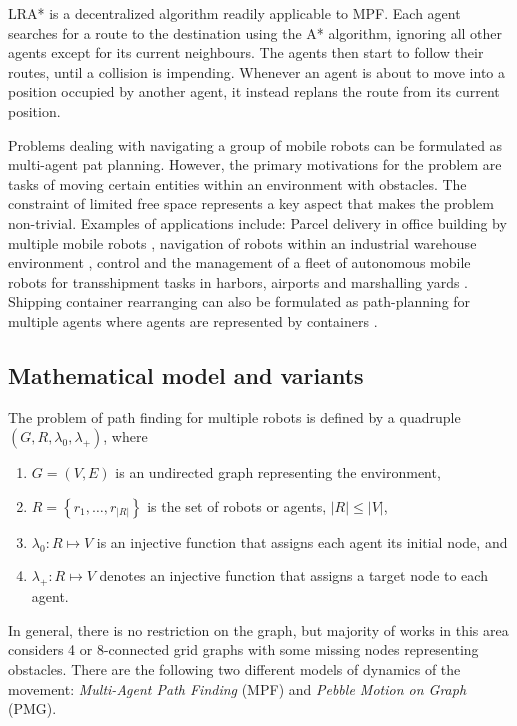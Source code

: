 LRA* \cite{silver05} is a decentralized algorithm readily applicable to MPF.
Each  agent searches for a route to the destination using the A* algorithm, ignoring all other agents except for its current neighbours. 
The agents then start to follow their routes, until a collision is impending.  
Whenever an agent is about to move into a position occupied by another agent, it instead replans the route from its current position.

Problems dealing with navigating a group of mobile robots can be formulated as multi-agent pat planning.  
However, the primary motivations for the problem are tasks of moving certain entities within an environment with obstacles.
The constraint of limited free space represents a key aspect that makes the problem non-trivial. 
Examples of applications include: 
Parcel delivery in office building by multiple mobile robots \cite{hada01},
navigation of robots within an industrial warehouse environment \cite{everett95},
control and the management of a fleet of autonomous mobile robots for transshipment tasks in harbors, airports and marshalling yards \cite{alami98}.
Shipping container rearranging can also be formulated as path-planning for multiple agents where agents are represented by containers \cite{surynek11}.

\subsection{Mathematical model and variants}\label{sect:modvar}

The problem of path finding for multiple robots is defined by a quadruple $(G,R,\lambda_0,\lambda_+)$, where
\begin{enumerate}
	\item $G=(V,E)$ is an undirected graph representing the environment,
	\item $R=\left\{r_1,\dots,r_{|R|}\right\}$ is the set of robots or agents, $|R|\leq|V|$,
	\item $\lambda_0:R\mapsto V$ is an injective function that assigns each agent its initial node, and
	\item $\lambda_+:R\mapsto V$ denotes an injective function that assigns a target node to each agent.
\end{enumerate}
In general, there is no restriction on the graph, but majority of works in this area considers 4 or 8-connected grid graphs with some missing nodes representing obstacles.
There are the following two different models of dynamics of the movement: \emph{Multi-Agent Path Finding} (MPF) and \emph{Pebble Motion on Graph} (PMG).

